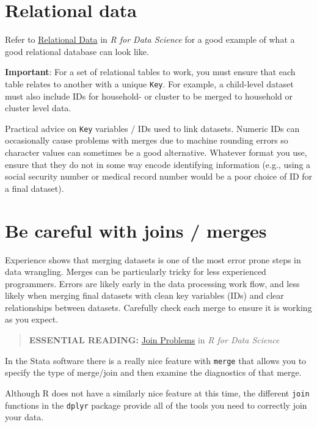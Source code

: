 \documentclass[
]{book}
\begin{document}
\hypertarget{relational-data}{%
\section{Relational data}\label{relational-data}}

Refer to \href{https://r4ds.had.co.nz/relational-data.html}{Relational Data} in \emph{R for Data Science} for a good example of what a good relational database can look like.

\textbf{Important}: For a set of relational tables to work, you must ensure that each table relates to another with a unique \texttt{Key}. For example, a child-level dataset must also include IDs for household- or cluster to be merged to household or cluster level data.

Practical advice on \texttt{Key} variables / IDs used to link datasets. Numeric IDs can occasionally cause problems with merges due to machine rounding errors so character values can sometimes be a good alternative. Whatever format you use, ensure that they do not in some way encode identifying information (e.g., using a social security number or medical record number would be a poor choice of ID for a final dataset).

\hypertarget{be-careful-with-joins-merges}{%
\section{Be careful with joins / merges}\label{be-careful-with-joins-merges}}

Experience shows that merging datasets is one of the most error prone steps in data wrangling. Merges can be particularly tricky for less experienced programmers. Errors are likely early in the data processing work flow, and less likely when merging final datasets with clean key variables (IDs) and clear relationships between datasets. Carefully check each merge to ensure it is working as you expect.

\begin{quote}
\textbf{ESSENTIAL READING:} \href{https://r4ds.had.co.nz/relational-data.html\#join-problems}{Join Problems} in \emph{R for Data Science}
\end{quote}

In the Stata software there is a really nice feature with \texttt{merge} that allows you to specify the type of merge/join and then examine the diagnostics of that merge.

Although R does not have a similarly nice feature at this time, the different \texttt{join} functions in the \texttt{dplyr} package provide all of the tools you need to correctly join your data.
\end{document}
